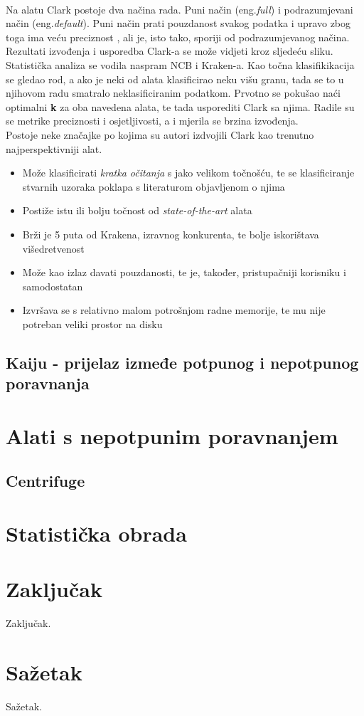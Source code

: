\documentclass[times, utf8, seminar]{fer}
\begin{document}
\\Na alatu Clark postoje dva načina rada. Puni način (eng.\textit{full}) i podrazumjevani način (eng.\textit{default}). Puni način prati pouzdanost svakog podatka i upravo zbog toga ima veću preciznost , ali je, isto tako, sporiji od podrazumjevanog načina.
\\Rezultati izvođenja i usporedba Clark-a se može vidjeti kroz sljedeću sliku.
\\Statistička analiza se vodila naspram NCB i Kraken-a. Kao točna klasifikikacija se gledao rod, a ako je neki od alata klasificirao neku višu granu, tada se to u njihovom radu smatralo neklasificiranim podatkom. Prvotno se pokušao naći optimalni \textbf{k} za oba navedena alata, te tada usporediti Clark sa njima. Radile su se metrike preciznosti i osjetljivosti, a i mjerila se brzina izvođenja.
\\Postoje neke značajke po kojima su autori izdvojili Clark kao trenutno najperspektivniji alat.
\begin{itemize}
	\item Može klasificirati \textit{kratka očitanja} s jako velikom točnošću, te se klasificiranje stvarnih uzoraka poklapa s literaturom objavljenom o njima
	\item Postiže istu ili bolju točnost od \textit{state-of-the-art} alata
	\item Brži je 5 puta od Krakena, izravnog konkurenta, te bolje iskorištava višedretvenost
	\item Može kao izlaz davati pouzdanosti, te je, također, pristupačniji korisniku i samodostatan
	\item Izvršava se s relativno malom potrošnjom radne memorije, te mu nije potreban veliki prostor na disku
\end{itemize}
\section{Kaiju - prijelaz izmeđe potpunog i nepotpunog poravnanja}
\chapter{Alati s nepotpunim poravnanjem}
\section{Centrifuge}
\chapter{Statistička obrada}
\chapter{Zaključak}
Zaključak.




\chapter{Sažetak}
Sažetak.
\end{document}
